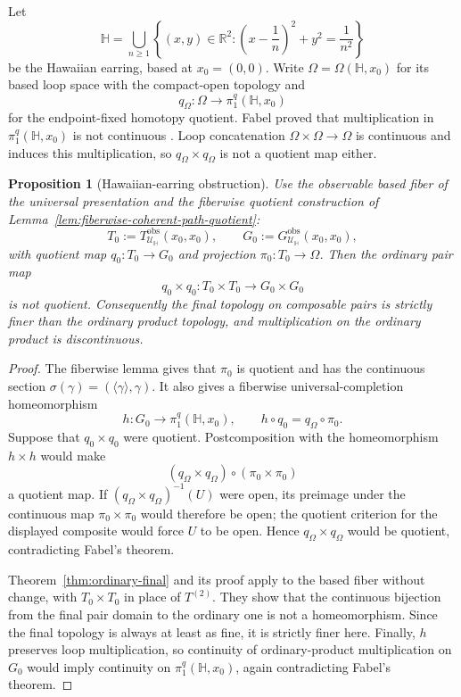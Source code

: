 \documentclass[10pt,reqno]{amsart}
\theoremstyle{definition}
\theoremstyle{plain}
\newtheorem{proposition}[definition]{Proposition}
\theoremstyle{remark}
\begin{document}
Let
\[
  \mathbb H=\bigcup_{n\geq 1}
  \left\{(x,y)\in\mathbb R^2:
  \left(x-\frac1n\right)^2+y^2=\frac1{n^2}\right\}
\]
be the Hawaiian earring, based at $x_0=(0,0)$.  Write
$\Omega=\Omega(\mathbb H,x_0)$ for its based loop space with the compact-open
topology and
\[
  q_\Omega:\Omega\longrightarrow\pi_1^q(\mathbb H,x_0)
\]
for the endpoint-fixed homotopy quotient.  Fabel proved that multiplication
in $\pi_1^q(\mathbb H,x_0)$ is not continuous \cite{Fabel11}.  Loop
concatenation $\Omega\times\Omega\to\Omega$ is continuous and induces this
multiplication, so $q_\Omega\times q_\Omega$ is not a quotient map either.

\begin{proposition}[Hawaiian-earring obstruction]
\label{prop:hawaiian-earring}
Use the observable based fiber of the universal presentation and the
fiberwise quotient construction of Lemma~\ref{lem:fiberwise-coherent-path-quotient}:
\[
  T_0:=T_{\mathcal U_{\mathbb H}}^{\mathrm{obs}}(x_0,x_0),
  \qquad
  G_0:=G_{\mathcal U_{\mathbb H}}^{\mathrm{obs}}(x_0,x_0),
\]
with quotient map $q_0:T_0\to G_0$ and projection
$\pi_0:T_0\to\Omega$.  Then the ordinary
pair map
\[
  q_0\times q_0:T_0\times T_0\longrightarrow G_0\times G_0
\]
is not quotient.  Consequently the final topology on composable pairs is
strictly finer than the ordinary product topology, and multiplication on the
ordinary product is discontinuous.
\end{proposition}

\begin{proof}
The fiberwise lemma gives that $\pi_0$ is quotient and has the continuous
section $\sigma(\gamma)=(\langle\gamma\rangle,\gamma)$.  It also gives a
fiberwise universal-completion homeomorphism
\[
  h:G_0\longrightarrow\pi_1^q(\mathbb H,x_0),
  \qquad h\circ q_0=q_\Omega\circ\pi_0.
\]
Suppose that $q_0\times q_0$ were
quotient.  Postcomposition with the homeomorphism $h\times h$ would make
\[
  (q_\Omega\times q_\Omega)\circ(\pi_0\times\pi_0)
\]
a quotient map.  If $(q_\Omega\times q_\Omega)^{-1}(U)$ were open, its
preimage under the continuous map $\pi_0\times\pi_0$ would therefore be open;
the quotient criterion for the displayed composite would force $U$ to be
open.  Hence $q_\Omega\times q_\Omega$ would be quotient, contradicting
Fabel's theorem.

Theorem~\ref{thm:ordinary-final} and its proof apply to the based fiber
without change, with $T_0\times T_0$ in place of $T^{(2)}$.  They show that the
continuous bijection from the final pair domain to the ordinary one is not a
homeomorphism.  Since the final topology is always at least as fine, it is
strictly finer here.  Finally, $h$ preserves loop multiplication, so
continuity of ordinary-product multiplication on $G_0$ would imply continuity
on $\pi_1^q(\mathbb H,x_0)$, again contradicting Fabel's theorem.
\end{proof}
\end{document}
